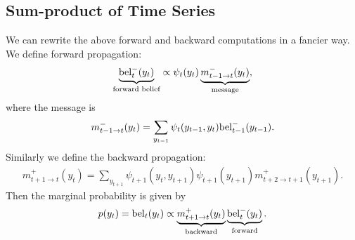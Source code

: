 \documentclass{article}
\begin{document}
\subsection{Sum-product of Time Series}
We can rewrite the above forward and backward computations in a fancier way. We define forward propagation:
\begin{align*}
\underbrace{{\rm bel}_t^-(y_t)}_{\text{forward belief}}
\propto \psi_t(y_t)
\underbrace{m_{t-1\rightarrow t}^-(y_t)}_{\text{message}},
\end{align*}
where the message is 
\begin{align*}
m_{t-1\rightarrow t}^-(y_t)=\sum_{y_{t-1}}\psi_t(y_{t-1},y_t){\rm bel}_{t-1}^-(y_{t-1}).
\end{align*}
Similarly we define the backward propagation:
\begin{align*}
m_{t+1\rightarrow t}^+(y_t)=\sum_{y_{t+1}}\psi_{t+1}(y_t,y_{t+1})\psi_{t+1}(y_{t+1})m_{t+2\rightarrow t+1}^+(y_{t+1}).
\end{align*}
Then the marginal probability is given by 
\begin{align*}
p(y_t)={\rm bel}_t(y_t)\propto \underbrace{m_{t+1\rightarrow t}^+(y_t)}_{\text{backward}}\underbrace{{\rm bel}_t^{-}(y_t)}_{\text{forward}}.
\end{align*}
\end{document}
